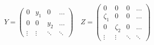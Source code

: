 \begin{equation}
Y = \begin{pmatrix}0&y_1&0&\dots\\
0&0&y_2&\dots\\
\vdots&\vdots&\ddots&\ddots
\end{pmatrix}
\quad Z = \begin{pmatrix}
0&0&0&\dots\\
\zeta_1&0&0&\dots\\
0& \zeta_2&0&\dots\\
\vdots&\vdots&\ddots&\ddots
\end{pmatrix}
\end{equation}

